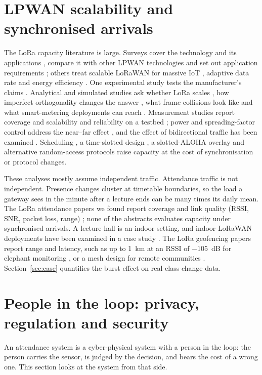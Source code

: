 \documentclass[preprint,12pt]{elsarticle}
\begin{document}
\section{LPWAN scalability and synchronised arrivals}\label{sec:lpwan}
The LoRa capacity literature is large. Surveys cover the technology and its applications \cite{@3,@3162}, compare it with other LPWAN technologies \cite{@1} and set out application requirements \cite{@13}; others treat scalable LoRaWAN for massive IoT \cite{@4}, adaptive data rate \cite{@22} and energy efficiency \cite{@191,@311}. One experimental study tests the manufacturer's claims \cite{@6}. Analytical and simulated studies ask whether LoRa scales \cite{bor2016scale,georgiou2017scale,adelantado2017limits,@10}, how imperfect orthogonality changes the answer \cite{mahmood2019scalability,@3165}, what frame collisions look like \cite{rahmadhani2018collide} and what smart-metering deployments can reach \cite{varsier2017capacity}. Measurement studies report coverage and scalability \cite{@3166,@3168} and reliability on a testbed \cite{@14}; power and spreading-factor control address the near--far effect \cite{@20}, and the effect of bidirectional traffic has been examined \cite{@29}. Scheduling \cite{@15,@44}, a time-slotted design \cite{@37}, a slotted-ALOHA overlay \cite{@24} and alternative random-access protocols \cite{@51} raise capacity at the cost of synchronisation or protocol changes.

These analyses mostly assume independent traffic. Attendance traffic is not independent. Presence changes cluster at timetable boundaries, so the load a gateway sees in the minute after a lecture ends can be many times its daily mean. The LoRa attendance papers we found report coverage and link quality (RSSI, SNR, packet loss, range) \cite{@850,@1355}; none of the abstracts evaluates capacity under synchronised arrivals. A lecture hall is an indoor setting, and indoor LoRaWAN deployments have been examined in a case study \cite{@25}. The LoRa geofencing papers report range and latency, such as up to 1~km at an RSSI of $-105$~dB for elephant monitoring \cite{@1870}, or a mesh design for remote communities \cite{@357}. Section~\ref{sec:case} quantifies the burst effect on real class-change data.

\section{People in the loop: privacy, regulation and security}\label{sec:priv}
An attendance system is a cyber-physical system with a person in the loop: the person carries the sensor, is judged by the decision, and bears the cost of a wrong one. This section looks at the system from that side.
\end{document}
